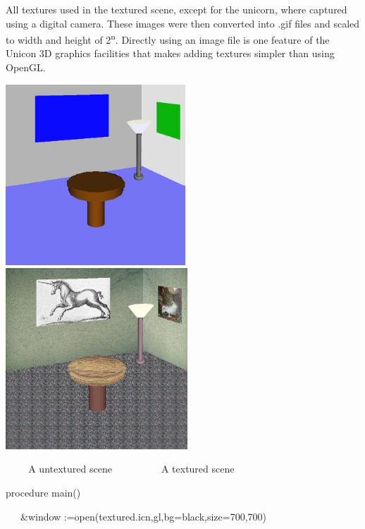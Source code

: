 \documentclass[letterpaper]{article}
\begin{document}
{
All textures used in the textured scene, except for the unicorn, where captured using a digital camera. These images
were then converted into .gif files and scaled to width and height of 2\textsuperscript{n}. Directly using an image
file is one feature of the Unicon 3D graphics facilities that makes adding textures simpler than using OpenGL. }


\bigskip

{
 \includegraphics[width=2.6543in,height=2.6693in]{utr9/utr9-img032.jpg} \textbf{ \ \ \ \ \ \ \ \ \ \ \ \ \ }
\includegraphics[width=2.6846in,height=2.6693in]{utr9/utr9-img033.jpg} }

{
\textbf{\ \ \ \ }A untextured scene\ \ \ \ \ \ \ \ \ \ A textured scene}


\bigskip

{\sffamily
procedure main()}

{\sffamily
\ \ \ \&window
:=open({\textquotedbl}textured.icn{\textquotedbl},{\textquotedbl}gl{\textquotedbl},{\textquotedbl}bg=black{\textquotedbl},{\textquotedbl}size=700,700{\textquotedbl})}


\bigskip
\end{document}
